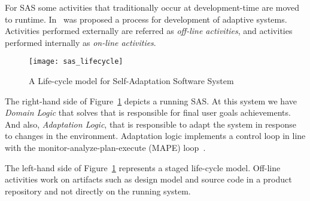 For SAS some activities that traditionally occur at development-time are moved to runtime.  In~\cite{andersson_software_2013}
was proposed a process for development of adaptive systems.
Activities performed externally are referred as \emph{off-line activities}, and activities performed internally as \emph{on-line activities}.


\begin{figure}[!htb]
  \centering
  \texttt{[image: sas\_lifecycle]}
  \caption{A Life-cycle model for Self-Adaptation Software System\cite{andersson_software_2013}}
  \label{fig:sas_lifecycle}
\end{figure}

The right-hand side of Figure~\ref{fig:sas_lifecycle} depicts a running SAS. At this system we have \emph{Domain Logic} that solves that is responsible for final user goals achievements. And also, \emph{Adaptation Logic}, that is responsible to adapt the system in response to changes in the environment. Adaptation logic implements a control loop in line with the monitor-analyze-plan-execute (MAPE) loop~\cite{kephart_vision_2003}.

The left-hand side of Figure~\ref{fig:sas_lifecycle} represents a staged life-cycle model. Off-line activities work on artifacts such as design model and source code in a product repository and not directly on the running system.
